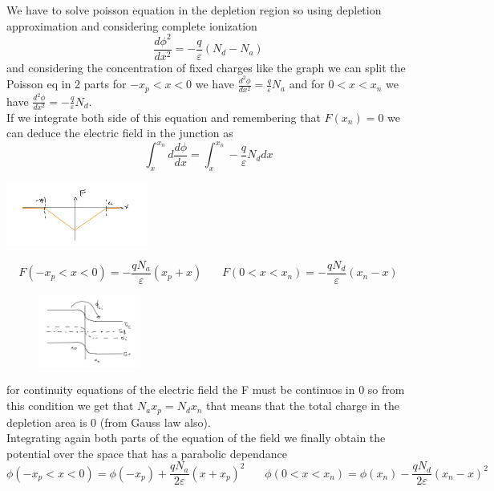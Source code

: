 We have to solve poisson equation in the depletion region so using depletion approximation and considering complete ionization
\begin{equation}
\frac{d\phi^2}{dx^2}=-\frac{q}{\varepsilon}(N_d-N_a)
\end{equation} 
and considering the concentration of fixed charges like the graph we can split the Poisson eq in 2 parts for $-x_p<x<0$ we have $\frac{d^2\phi}{dx^2}=\frac{q}{\varepsilon}N_a$ and for $0<x<x_n$ we have $\frac{d^2\phi}{dx^2}=-\frac{q}{\varepsilon}N_d$.\\
If we integrate both side of this equation and remembering that $F(x_n)=0$ we can deduce the electric field in the junction as 
\begin{equation}
\int^{x_n}_{x} d\frac{d\phi}{dx}=\int^{x_n}_{x}-\frac{q}{\varepsilon}N_d dx
\end{equation}

\centering
\includegraphics[width=0.35\textwidth]{pn4.png}\\
\raggedright

\begin{equation}
F(-x_p<x<0)=-\frac{qN_a}{\varepsilon}(x_p+x)\ \ \ \ \ \ \ \ F(0<x<x_n)=-\frac{qN_d}{\varepsilon}(x_n-x)
\end{equation}

\begin{figure}
\includegraphics[width=0.3\textwidth]{pn5.png}
\end{figure}

for continuity equations of the electric field the F must be continuos in 0 so from this condition we get that $N_ax_p=N_dx_n$ that means that the total charge in the depletion area is 0 (from Gauss law also).\\
Integrating again both parts of the equation of the field we finally obtain the potential over the space that has a parabolic dependance
\begin{equation}
\phi(-x_p<x<0)=\phi(-x_p)+\frac{qN_a}{2\varepsilon}(x+x_p)^2 \ \ \ \ \ \ \ \ \phi(0<x<x_n)=\phi(x_n)-\frac{qN_d}{2\varepsilon}(x_n-x)^2
\end{equation}


